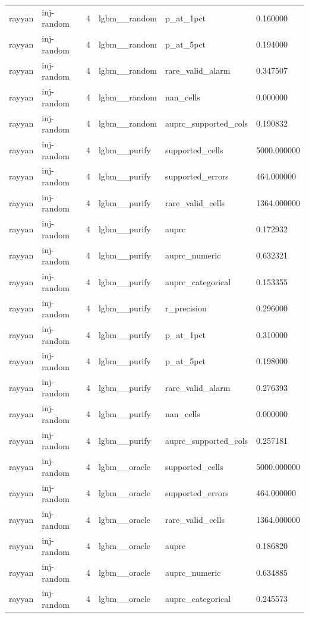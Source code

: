 \begin{tabular}{llllll}
rayyan & inj-random & 4 & lgbm\_\_random & p\_at\_1pct & 0.160000 \\
rayyan & inj-random & 4 & lgbm\_\_random & p\_at\_5pct & 0.194000 \\
rayyan & inj-random & 4 & lgbm\_\_random & rare\_valid\_alarm & 0.347507 \\
rayyan & inj-random & 4 & lgbm\_\_random & nan\_cells & 0.000000 \\
rayyan & inj-random & 4 & lgbm\_\_random & auprc\_supported\_cols & 0.190832 \\
rayyan & inj-random & 4 & lgbm\_\_purify & supported\_cells & 5000.000000 \\
rayyan & inj-random & 4 & lgbm\_\_purify & supported\_errors & 464.000000 \\
rayyan & inj-random & 4 & lgbm\_\_purify & rare\_valid\_cells & 1364.000000 \\
rayyan & inj-random & 4 & lgbm\_\_purify & auprc & 0.172932 \\
rayyan & inj-random & 4 & lgbm\_\_purify & auprc\_numeric & 0.632321 \\
rayyan & inj-random & 4 & lgbm\_\_purify & auprc\_categorical & 0.153355 \\
rayyan & inj-random & 4 & lgbm\_\_purify & r\_precision & 0.296000 \\
rayyan & inj-random & 4 & lgbm\_\_purify & p\_at\_1pct & 0.310000 \\
rayyan & inj-random & 4 & lgbm\_\_purify & p\_at\_5pct & 0.198000 \\
rayyan & inj-random & 4 & lgbm\_\_purify & rare\_valid\_alarm & 0.276393 \\
rayyan & inj-random & 4 & lgbm\_\_purify & nan\_cells & 0.000000 \\
rayyan & inj-random & 4 & lgbm\_\_purify & auprc\_supported\_cols & 0.257181 \\
rayyan & inj-random & 4 & lgbm\_\_oracle & supported\_cells & 5000.000000 \\
rayyan & inj-random & 4 & lgbm\_\_oracle & supported\_errors & 464.000000 \\
rayyan & inj-random & 4 & lgbm\_\_oracle & rare\_valid\_cells & 1364.000000 \\
rayyan & inj-random & 4 & lgbm\_\_oracle & auprc & 0.186820 \\
rayyan & inj-random & 4 & lgbm\_\_oracle & auprc\_numeric & 0.634885 \\
rayyan & inj-random & 4 & lgbm\_\_oracle & auprc\_categorical & 0.245573 \\

\end{tabular}

